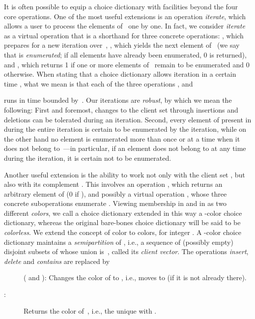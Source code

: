 \documentclass[envcountsame,envcountsect,undated,nolinenumbers]{lnthi}
\def\Tvn#1{\hbox{\textit{#1\/}}}
\begin{document}
It is often possible to equip a choice dictionary
with facilities beyond the four core operations.
One of the most useful extensions is an operation
\Tvn{iterate}, which allows a user to process
the elements of~ one by one.
In fact, we consider \Tvn{iterate} as a virtual
operation that is a shorthand for three concrete operations:
, which prepares
for a new iteration over~,
, which
yields the next element  of~
(we say that  is \emph{enumerated};
if all elements have already been enumerated,
0 is returned), and
, which returns 1 if
one or more elements of~ remain to be enumerated
and 0 otherwise.
When stating that a choice dictionary allows
iteration in a certain time , what we mean
is that each of the three operations
,
 and

runs in time bounded by~.
Our iterations are \emph{robust}, by
which we mean the following:
First and foremost, changes to the
client set  through insertions
and deletions can be tolerated during an iteration.
Second, every element of  present in  during
the entire iteration is certain to be enumerated
by the iteration, while on the other hand no
element is enumerated more than once or at a time when it
does not belong to~---in particular, if an element
does not belong to  at any time during the
iteration, it is certain not to be enumerated.

Another useful extension is the ability to work
not only with the client set , but also with
its complement .
This involves an operation
, which returns an arbitrary element
of  (0 if ),
and possibly a virtual operation ,
whose three concrete suboperations enumerate
.
Viewing membership in  and in 
as two different \emph{colors}, we call a choice
dictionary extended in this way a -color choice dictionary,
whereas the original bare-bones choice dictionary
will be said to be \emph{colorless}.
We extend the concept of color
to  colors, for integer .
A -color choice dictionary maintains a
\emph{semipartition} 
of , i.e.,
a sequence of (possibly empty)
disjoint subsets of  whose union is~,
called its \emph{client vector}.
The operations \Tvn{insert}, \Tvn{delete}
and \Tvn{contains} are replaced by

\begin{description}
\item[\normalfont]
( and ):
Changes the color of  to , i.e.,
moves  to  (if it is not already there).
\item[\normalfont:]
Returns the color of~, i.e.,
the unique  with .
\end{description}
\end{document}

